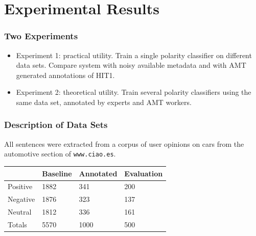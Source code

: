 \documentclass[10pt]{beamer}
\newenvironment{itemwide}%
{\begin{itemize}%
    \setlength{\itemsep}{5pt}%
    \setlength{\parskip}{5pt}}%
  {\end{itemize}}
\begin{document}
\section{Experimental Results}

\begin{frame}
  \frametitle{Two Experiments}
\begin{itemwide}
 \item Experiment 1: practical utility. Train a single polarity classifier on different data sets. Compare system with noisy available metadata and with AMT generated annotations of HIT1.
 \item Experiment 2: theoretical utility. Train several polarity classifiers using the same data set, annotated by experts and AMT workers.
\end{itemwide}

\end{frame}

\begin{frame}
  \frametitle{Description of Data Sets}

All sentences were extracted from a corpus of user opinions on cars from the automotive section of \texttt{www.ciao.es}.


\vspace{1cm}

\begin{center}
\begin{tabular}{|l|l|l|l|}
\hline
&Baseline &Annotated &Evaluation \\
\hline
Positive &1882 &341 &200 \\
\hline
Negative &1876 &323 &137 \\
\hline
Neutral &1812 &336 &161 \\
\hline
Totals &5570 &1000 &500 \\
\hline
\end{tabular}
\end{center}

\end{frame}
\end{document}
